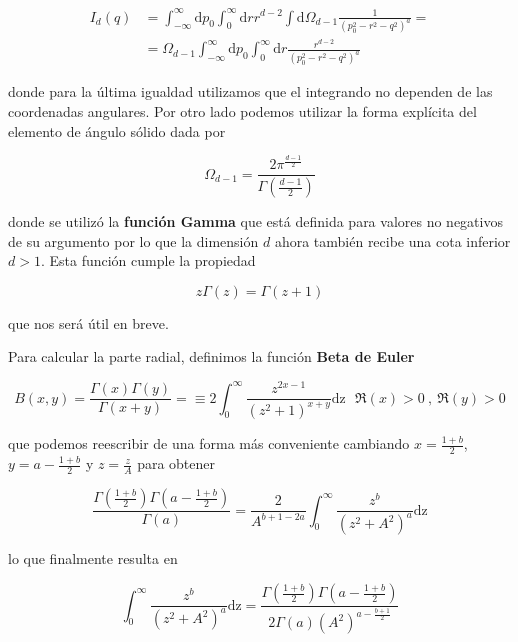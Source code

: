 \documentclass{article}
\numberwithin{equation}{section}
\begin{document}
\begin{equation}\label{auxRD}
\begin{aligned}
I_d(q)&=\int_{-\infty}^{\infty}\mathrm{d}p_0\int_{0}^{\infty} \mathrm{d}r r^{d-2}  \int \mathrm{d} \Omega_{d-1} \frac{1}{\left(p_0^2 - r^2 -q^2\right)^a}=\\
&=\Omega_{d-1} \int_{-\infty}^{\infty}\mathrm{d}p_0\int_{0}^{\infty}\mathrm{d}r \frac{r^{d-2}}{\left(p_0^2 - r^2 -q^2\right)^a}
\end{aligned}
\end{equation}

donde para la última igualdad utilizamos que el integrando no dependen de las coordenadas angulares. Por otro lado podemos utilizar la forma explícita del elemento de ángulo sólido dada por

\begin{equation}\label{angulosolido}
\Omega_{d-1} = \frac{2 \pi^{\frac{d-1}{2}}}{\Gamma (\frac{d-1}{2})}
\end{equation}

donde se utilizó la \textbf{función Gamma} que está definida para valores no negativos de su argumento por lo que la dimensión $ d $ ahora también recibe una cota inferior $ d>1 $. Esta función cumple la propiedad 

\begin{equation}\label{key}
z \Gamma(z)= \Gamma(z+1)
\end{equation} 

que nos será útil en breve.

Para calcular la parte radial, definimos la función \textbf{Beta de Euler}

\begin{equation}\label{betaeuler}
B(x,y)=\frac{\Gamma(x) \Gamma(y)}{\Gamma(x+y)} = \equiv 2 \int_0^{\infty} \frac{z^{2x-1}}{(z^2+1)^{x+y}}\mathrm{dz} \ \ \ \Re(x)>0 \ , \ \Re(y)>0
\end{equation}

que podemos reescribir de una forma más conveniente cambiando $ x=\frac{1+b}{2} $, $ y=a - \frac{1+b}{2} $ y $ z=\frac{z}{A} $ para obtener

\begin{equation}
\frac{\Gamma(\frac{1+b}{2}) \Gamma(a - \frac{1+b}{2})}{\Gamma(a)} =\frac{2}{A^{b+1-2a}} \int_0^{\infty} \frac{z^b}{(z^2+A^2)^a}\mathrm{dz}
\end{equation}

lo que finalmente resulta en 

\begin{equation}\label{betaeuler2}
\int_0^{\infty} \frac{z^b}{(z^2+A^2)^a}\mathrm{dz} = \frac{\Gamma(\frac{1+b}{2}) \Gamma(a - \frac{1+b}{2})}{2 \Gamma(a) (A^2)^{a-\frac{b+1}{2}}} 
\end{equation}
\end{document}
